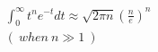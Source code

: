 \documentclass[preview]{standalone}
\begin{document}
\begin{align*}
\displaystyle \int_0^{\infty}t^{n}e^{-t}dt \approx \sqrt{2\pi n}(\frac{n}{e})^n \\ ( \ when \ n \gg 1 \ )
\end{align*}
\end{document}
